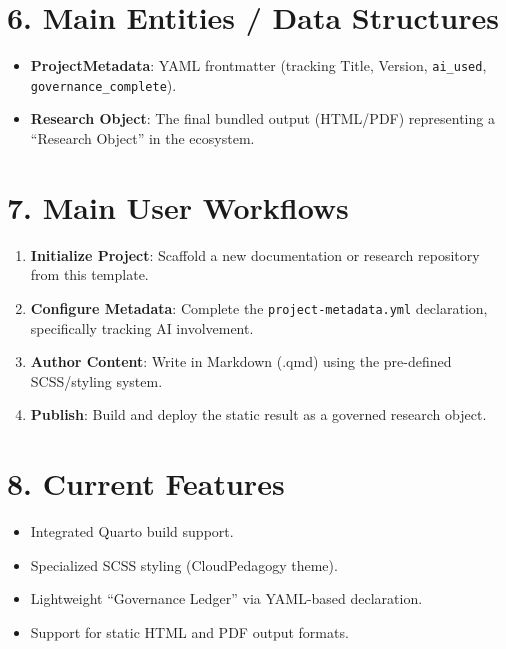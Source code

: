 \documentclass[
]{report}
\providecommand{\tightlist}{%
  \setlength{\itemsep}{0pt}\setlength{\parskip}{0pt}}
\begin{document}
\section{6. Main Entities / Data
Structures}\label{main-entities-data-structures}

\begin{itemize}
\tightlist
\item
  \textbf{ProjectMetadata}: YAML frontmatter (tracking Title, Version,
  \texttt{ai\_used}, \texttt{governance\_complete}).
\item
  \textbf{Research Object}: The final bundled output (HTML/PDF)
  representing a ``Research Object'' in the ecosystem.
\end{itemize}

\section{7. Main User Workflows}\label{main-user-workflows}

\begin{enumerate}
\def\labelenumi{\arabic{enumi}.}
\tightlist
\item
  \textbf{Initialize Project}: Scaffold a new documentation or research
  repository from this template.
\item
  \textbf{Configure Metadata}: Complete the
  \texttt{project-metadata.yml} declaration, specifically tracking AI
  involvement.
\item
  \textbf{Author Content}: Write in Markdown (.qmd) using the
  pre-defined SCSS/styling system.
\item
  \textbf{Publish}: Build and deploy the static result as a governed
  research object.
\end{enumerate}

\section{8. Current Features}\label{current-features}

\begin{itemize}
\tightlist
\item
  Integrated Quarto build support.
\item
  Specialized SCSS styling (CloudPedagogy theme).
\item
  Lightweight ``Governance Ledger'' via YAML-based declaration.
\item
  Support for static HTML and PDF output formats.
\end{itemize}
\end{document}
